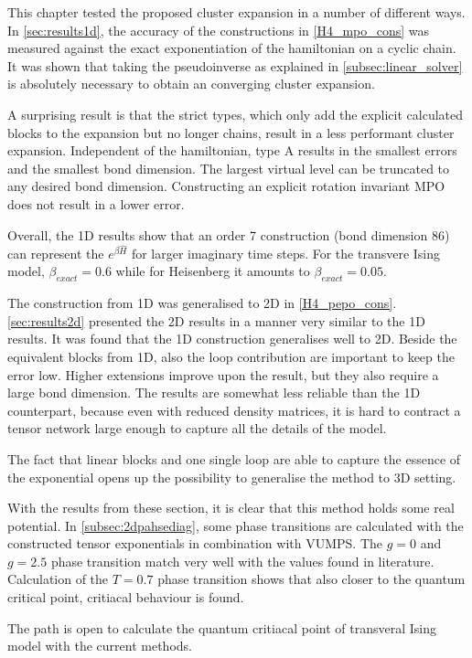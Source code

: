 This chapter tested the proposed cluster expansion in a number of different ways. In \cref{sec:results1d}, the accuracy of the constructions in \cref{H4_mpo_cons} was measured against the exact exponentiation of the hamiltonian on a cyclic chain. It was shown that taking the pseudoinverse as explained in \cref{subsec:linear_solver} is absolutely necessary to obtain an converging cluster expansion.

A surprising result is that the strict types, which only add the explicit calculated blocks to the expansion but no longer chains, result in a less performant cluster expansion. Independent of the hamiltonian, type A results in the smallest errors and the smallest bond dimension. The largest virtual level can be truncated to any desired bond dimension. Constructing an explicit rotation invariant MPO does not result in a lower error.

Overall, the 1D results show that an order 7 construction (bond dimension 86) can represent the $e^{\beta \hat{H}}$ for larger imaginary time steps. For the transvere Ising model, $\beta_{exact} = 0.6$ while for Heisenberg it amounts to $\beta_{exact} = 0.05$.

The construction from 1D was generalised to 2D in \cref{H4_pepo_cons}. \cref{sec:results2d} presented the 2D results in a manner very similar to the 1D results. It was found that the 1D construction generalises well to 2D. Beside the equivalent blocks from 1D, also the loop contribution are important to keep the error low. Higher extensions improve upon the result, but they also require a large bond dimension. The results are somewhat less reliable than the 1D counterpart, because even with reduced density matrices, it is hard to contract a tensor network large enough to capture all the details of the model.

The fact that linear blocks and one single loop are able to capture the essence of the exponential opens up the possibility to generalise the method to 3D setting.

With the results from these section, it is clear that this method holds some real potential. In \cref{subsec:2dpahsediag}, some phase transitions are calculated with the constructed tensor exponentials in combination with VUMPS. The $g=0$ and $g=2.5$ phase transition match very well with the values found in literature. Calculation of the $T=0.7$ phase transition shows that also closer to the quantum critical point, critiacal behaviour is found.

The path is open to calculate the quantum critiacal point of transveral Ising model with the current methods.